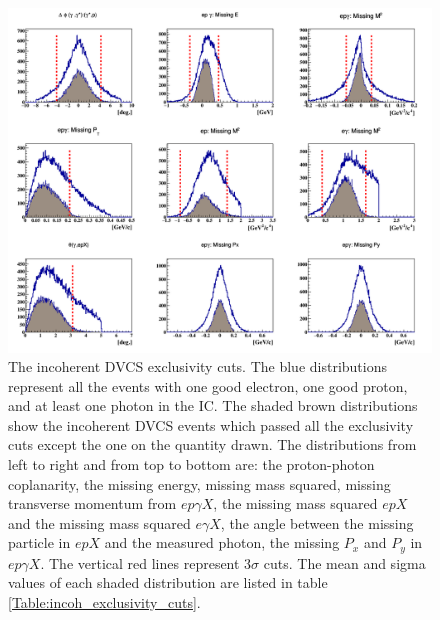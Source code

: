 \begin{figure}[h!]
\centering
\includegraphics[scale=0.4]{fig_dvcs/all_incoh_exc_cuts.png}
\caption{The incoherent DVCS exclusivity cuts. The blue distributions represent all the events with one good electron, one good proton, and at least one photon in the IC. The shaded brown distributions show the incoherent DVCS events which passed all the exclusivity cuts except the one on the quantity drawn. The distributions from left to right and from top to bottom are: the proton-photon coplanarity, the missing energy, missing mass squared, missing transverse momentum from $ep\gamma X$, the missing mass squared $epX$ and the missing mass squared $e\gamma X$, the angle between the missing particle in $epX$ and the measured photon, the missing $P_{x}$ and $P_{y}$ in $ep\gamma X$. The vertical red lines represent 3$\sigma$ cuts. The mean and sigma values of each shaded distribution are listed in table \ref{Table:incoh_exclusivity_cuts}.} 
\label{fig:incoh_exclusivty_cuts}
\end{figure}

